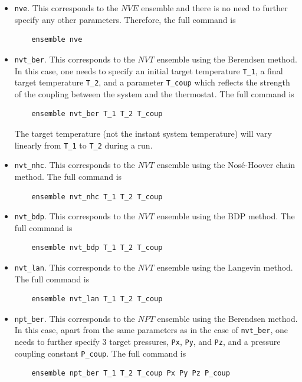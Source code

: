 \documentclass[12pt,a4paper]{report}
\begin{document}
\begin{itemize}

\item \verb"nve". This corresponds to the $NVE$ ensemble and there is no need to further specify any other parameters. Therefore, the full command is
\begin{verbatim}
    ensemble nve
\end{verbatim}

\item \verb"nvt_ber". This corresponds to the $NVT$ ensemble using the Berendsen method. In this case, one needs to specify an initial target temperature \verb"T_1", a final target temperature \verb"T_2", and a parameter \verb"T_coup" which reflects the strength of the coupling between the system and the thermostat. The full command is
\begin{verbatim}
    ensemble nvt_ber T_1 T_2 T_coup
\end{verbatim}
The target temperature (not the instant system temperature) will vary linearly from \verb"T_1" to \verb"T_2" during a run.

\item \verb"nvt_nhc". This corresponds to the $NVT$ ensemble using the Nos\'{e}-Hoover chain method. The full command is
\begin{verbatim}
    ensemble nvt_nhc T_1 T_2 T_coup
\end{verbatim}

\item \verb"nvt_bdp". This corresponds to the $NVT$ ensemble using the BDP method. The full command is
\begin{verbatim}
    ensemble nvt_bdp T_1 T_2 T_coup
\end{verbatim}

\item \verb"nvt_lan". This corresponds to the $NVT$ ensemble using the Langevin method. The full command is
\begin{verbatim}
    ensemble nvt_lan T_1 T_2 T_coup
\end{verbatim}

\item \verb"npt_ber". This corresponds to the $NPT$ ensemble using the Berendsen method. In this case, apart from the same parameters as in the case of \verb"nvt_ber", one needs to further specify 3 target pressures, \verb"Px", \verb"Py", and \verb"Pz", and a pressure coupling constant \verb"P_coup". The full command is
\begin{verbatim}
    ensemble npt_ber T_1 T_2 T_coup Px Py Pz P_coup
\end{verbatim}


\end{itemize}
\end{document}
